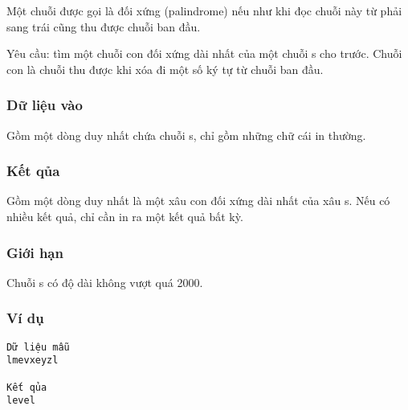 



   Một chuỗi được gọi là đối xứng (palindrome) nếu như khi đọc chuỗi này từ phải sang trái cũng thu được chuỗi ban đầu.  

   Yêu cầu: tìm một chuỗi con đối xứng dài nhất của một chuỗi s cho trước. Chuỗi con là chuỗi thu được khi xóa đi một số ký tự từ chuỗi ban đầu.  

\subsubsection{   Dữ liệu vào  }

   Gồm một dòng duy nhất chứa chuỗi s, chỉ gồm những chữ cái in thường.  

\subsubsection{   Kết qủa  }

   Gồm một dòng duy nhất là một xâu con đối xứng dài nhất của xâu s. Nếu có nhiều kết quả, chỉ cần in ra một kết quả bất kỳ.  

\subsubsection{   Giới hạn  }

   Chuỗi s có độ dài không vượt quá 2000.  

\subsubsection{   Ví dụ  }
\begin{verbatim}
Dữ liệu mẫu
lmevxeyzl

Kết qủa
level
\end{verbatim}